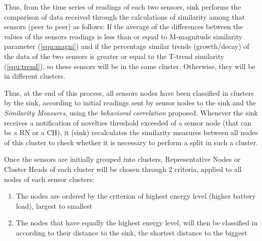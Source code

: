 \documentclass[conference]{IEEEtran}
\begin{document}
Thus, from the time series of readings of each two sensors, sink performs the
comparison of data received through the calculations of similarity among that
sensors (peer to peer) as follows:
If the average of the differences between the values of the sensors readings is
less than or equal to M-magnitude similarity parameter (\ref{equ:magni}) and if
the percentage similar trends (growth/decay) of the data of the two sensors is
greater or equal to the T-trend similarity (\ref{equ:trend}), so these sensors
will be in the same cluster.
Otherwise, they will be in different clusters.


Thus, at the end of this process, all sensors nodes have been classified in
clusters by the sink, according to initial readings sent by sensor nodes to the
sink and the \textit{Similarity Measures}, using the \textit{behavioral
correlation} proposed. Whenever the sink receives a notification of novelties
threshold exceeded of a sensor node (that can be a RN or a CH), it (sink)
recalculates the similarity measures between all nodes of this cluster to
check whether it is necessary to perform a split in such a cluster.

Once the sensors are initially grouped into clusters, Representative Nodes or
Cluster Heads of each cluster will be chosen through 2 criteria, applied to all
nodes of each sensor clusters:
\begin{enumerate}
    \item The nodes are ordered by the criterion of highest energy level (higher
    battery load), largest to smallest
    \item The nodes that have equally the highest energy level, will then be
    classified in according to their distance to the sink, the shortest distance
    to the biggest
 \end{enumerate}
\end{document}
